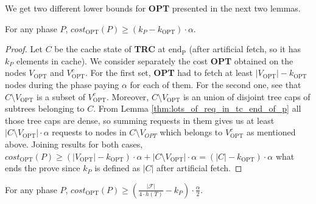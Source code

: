 We get two different lower bounds for \textbf{OPT} presented in the next two 
lemmas. 
\begin{lemma}
For any phase $P$, $cost_{\mathrm{OPT}}(P) \geq (k_P - k_{\mathrm{OPT}}) \cdot 
\alpha$.
\label{thm:opt_bound_with_k}
\end{lemma}
\begin{proof}
Let $C$ be the cache state of \textbf{TRC} at $\mathrm{end_P}$ (after 
artificial fetch, 
so it has $k_P$ elements in cache). We consider separately the cost 
\textbf{OPT} obtained on the nodes $V_{\mathrm{OPT}}$ and $V_{\mathrm{OPT}}^c$. 
For the first 
set, \textbf{OPT} had to fetch at least $|V_{\mathrm{OPT}}| - k_{\mathrm{OPT}}$ 
nodes during the 
phase paying $\alpha$ for each of them. For the second one, see that 
$C \setminus V_{\mathrm{OPT}}$ is a subset of $V_{\mathrm{OPT}}^c$. Moreover, 
$C \setminus 
V_{\mathrm{OPT}}$ is an union of disjoint tree caps of subtrees belonging to 
$C$. From 
Lemma \ref{thm:lots_of_req_in_tc_end_of_p} all those tree caps are dense, so 
summing requests in them gives us at least $|C \setminus V_{\mathrm{OPT}}| 
\cdot 
\alpha$ requests to nodes in $C \setminus V_{OPT}$ which belongs to 
$V_{\mathrm{OPT}}^c$ 
as mentioned above. Joining results for both cases, $cost_{\mathrm{OPT}}(P) 
\geq 
(|V_{\mathrm{OPT}}| - k_{\mathrm{OPT}}) \cdot \alpha + |C \setminus 
V_{\mathrm{OPT}}| \cdot 
\alpha = (|C| - k_{\mathrm{OPT}}) \cdot \alpha$ what ends the prove since $k_P$ 
is 
defined as $|C|$ after artificial fetch. 
\end{proof}
\begin{lemma}
For any phase $P$, $cost_{\mathrm{OPT}}(P) \geq (\frac{|\mathcal{F}|}{4 \cdot 
h(T)} 
-k_P) \cdot \frac{\alpha}{2}$.
\label{thm:opt_bound_with_F}
\end{lemma}

